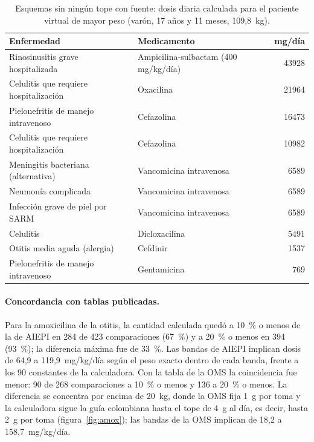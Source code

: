 \documentclass[11pt,a4paper]{article}
\begin{document}
\begin{table}[htbp]
\centering
\caption{Esquemas sin ningún tope con fuente: dosis diaria calculada para el paciente virtual de mayor peso (varón, 17 años y 11 meses, 109,8~kg).}
\label{tab:sintope}
\small
\begin{tabular}{@{}llr@{}}
\toprule
Enfermedad & Medicamento & mg/día \\
\midrule
Rinosinusitis grave hospitalizada & Ampicilina-sulbactam (400 mg/kg/día) & \num{43928} \\
Celulitis que requiere hospitalización & Oxacilina & \num{21964} \\
Pielonefritis de manejo intravenoso & Cefazolina & \num{16473} \\
Celulitis que requiere hospitalización & Cefazolina & \num{10982} \\
Meningitis bacteriana (alternativa) & Vancomicina intravenosa & \num{6589} \\
Neumonía complicada & Vancomicina intravenosa & \num{6589} \\
Infección grave de piel por SARM & Vancomicina intravenosa & \num{6589} \\
Celulitis & Dicloxacilina & \num{5491} \\
Otitis media aguda (alergia) & Cefdinir & \num{1537} \\
Pielonefritis de manejo intravenoso & Gentamicina & 769 \\
\bottomrule
\end{tabular}
\end{table}

\paragraph{Concordancia con tablas publicadas.} Para la amoxicilina de la otitis, la cantidad calculada quedó a 10~\% o menos de la de AIEPI en 284 de 423 comparaciones (67~\%) y a 20~\% o menos en 394 (93~\%); la diferencia máxima fue de 33~\%. Las bandas de AIEPI implican dosis de 64,9 a 119,9~mg/kg/día según el peso exacto dentro de cada banda, frente a los 90 constantes de la calculadora. Con la tabla de la OMS la coincidencia fue menor: 90 de 268 comparaciones a 10~\% o menos y 136 a 20~\% o menos. La diferencia se concentra por encima de 20~kg, donde la OMS fija 1~g por toma y la calculadora sigue la guía colombiana hasta el tope de 4~g al día, es decir, hasta 2~g por toma (figura~\ref{fig:amox}); las bandas de la OMS implican de 18,2 a 158,7~mg/kg/día.
\end{document}
